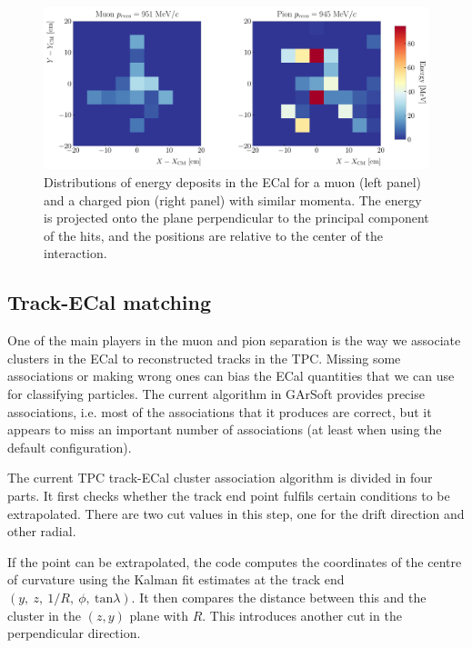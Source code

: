 \begin{figure}[t]
	\centering
	\includegraphics[width=.95\linewidth]{Images/GArSoft_PID/BDT/ecal_energy_distribution_example.pdf}
	\caption[Distributions of energy deposits in the ECal for a muon and a charged pion with similar momenta.]{Distributions of energy deposits in the ECal for a muon (left panel) and a charged pion (right panel) with similar momenta. The energy is projected onto the plane perpendicular to the principal component of the hits, and the positions are relative to the center of the interaction.}
	\label{fig:ecal_example}
\end{figure}

\subsection{Track-ECal matching}

One of the main players in the muon and pion separation is the way we associate clusters in the ECal to reconstructed tracks in the TPC. Missing some associations or making wrong ones can bias the ECal quantities that we can use for classifying particles. The current algorithm in GArSoft provides precise associations, i.e. most of the associations that it produces are correct, but it appears to miss an important number of associations (at least when using the default configuration).

The current TPC track-ECal cluster association algorithm is divided in four parts. It first checks whether the track end point fulfils certain conditions to be extrapolated. There are two cut values in this step, one for the drift direction and other radial.

If the point can be extrapolated, the code computes the coordinates of the centre of curvature using the Kalman fit estimates at the track end $(y, \ z, \ 1/R, \ \phi, \ \mathrm{tan}\lambda)$. It then compares the distance between this and the cluster in the $(z,y)$ plane with $R$. This introduces another cut in the perpendicular direction.

